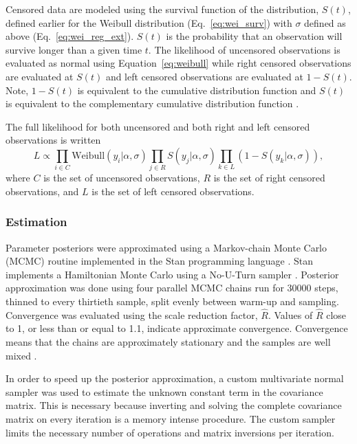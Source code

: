 \documentclass{article}
\begin{document}
Censored data are modeled using the survival function of the distribution, \(S(t)\), defined earlier for the Weibull distribution (Eq.~\ref{eq:wei_surv}) with \(\sigma\) defined as above (Eq.~\ref{eq:wei_reg_ext}). \(S(t)\) is the probability that an observation will survive longer than a given time \(t\). The likelihood of uncensored observations is evaluated as normal using Equation~\ref{eq:weibull} while right censored observations are evaluated at \(S(t)\) and left censored observations are evaluated at \(1 - S(t)\). Note, \(1 - S(t)\) is equivalent to the cumulative distribution function and \(S(t)\) is equivalent to the complementary cumulative distribution function \cite{Gelman2013d}.

The full likelihood for both uncensored and both right and left censored observations is written
\begin{equation*}
  L \propto \prod_{i \in C} \mathrm{Weibull}(y_{i} | \alpha, \sigma) \prod_{j \in R} S(y_j | \alpha, \sigma) \prod_{k \in L} \left(1 - S(y_{k} | \alpha, \sigma)\right),
\end{equation*}
where \(C\) is the set of uncensored observations, \(R\) is the set of right censored observations, and \(L\) is the set of left censored observations.


\subsubsection{Estimation}
Parameter posteriors were approximated using a Markov-chain Monte Carlo (MCMC) routine implemented in the Stan programming language \cite{2014stan}. Stan implements a Hamiltonian Monte Carlo using a No-U-Turn sampler \cite{Hoffman-Gelman:2011}. Posterior approximation was done using four parallel MCMC chains run for 30000 steps, thinned to every thirtieth sample, split evenly between warm-up and sampling. Convergence was evaluated using the scale reduction factor, \(\hat{R}\). Values of \(\hat{R}\) close to 1, or less than or equal to 1.1, indicate approximate convergence. Convergence means that the chains are approximately stationary and the samples are well mixed \cite{Gelman2013d}.

In order to speed up the posterior approximation, a custom multivariate normal sampler was used to estimate the unknown constant term in the covariance matrix. This is necessary because inverting and solving the complete covariance matrix on every iteration is a memory intense procedure. The custom sampler limits the necessary number of operations and matrix inversions per iteration.
\end{document}
